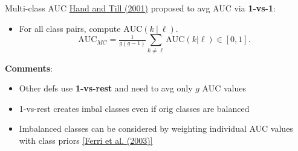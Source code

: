 \documentclass[11pt,compress,t,notes=noshow, xcolor=table]{beamer}
\begin{document}
\begin{vbframe}{Multi-class AUC}
\href{https://link.springer.com/article/10.1023/A:1010920819831}{Hand and Till (2001)} proposed to avg AUC via \textbf{1-vs-1}:

\begin{itemize}
    \item For all class pairs, 
        compute $\text{AUC}(k ~|~ \ell)$.
    $$\text{AUC}_{MC} = \tfrac{1}{g(g - 1)} \sum_{k \neq \ell} \text{AUC}(k | \ell) \in [0, 1].$$
\end{itemize}

\lz

\textbf{Comments}:

\begin{itemize}
\item Other defs use \textbf{1-vs-rest} and need to avg only $g$ AUC values
\item 1-vs-rest creates imbal classes even if orig classes are balanced
\item Imbalanced classes can be considered by weighting individual AUC values with class priors \href{https://doi.org/10.1016/j.patrec.2008.08.010}{[Ferri et al. (2003)]}
\end{itemize}

\end{vbframe}
\end{document}
